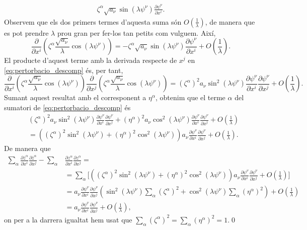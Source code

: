 {\begin{align*}
    \zeta^\alpha\sqrt{a_\nu}\sin(\lambda \psi^\nu)\frac{\partial\psi^\nu}{\partial x^i}.
\end{align*}
Observem que els dos primers termes d'aquesta suma són $O\left(\frac1\lambda\right)$, de manera que es pot prendre $\lambda$ prou gran per fer-los tan petits com vulguem. Així, 
\begin{equation*}
    \frac{\partial}{\partial x^i}\left( \zeta^\alpha\frac{\sqrt{a_\nu}}{\lambda}\cos(\lambda \psi^\nu)\right) = -
    \zeta^\alpha\sqrt{a_\nu}\sin(\lambda \psi^\nu)\frac{\partial\psi^\nu}{\partial x^i} + O\left(\frac1\lambda\right).
\end{equation*}
El producte d'aquest terme amb la derivada respecte de $x^j$ en \ref{eq:pertorbacio_descomp} és, per tant,
\begin{equation*}
    \frac{\partial}{\partial x^i}\left( \zeta^\alpha\frac{\sqrt{a_\nu}}{\lambda}\cos(\lambda \psi^\nu)\right) \frac{\partial}{\partial x^j}\left( \zeta^\alpha\frac{\sqrt{a_\nu}}{\lambda}\cos(\lambda \psi^\nu)\right) = 
    (\zeta^\alpha)^2{a_\nu}\sin^2(\lambda \psi^\nu)\frac{\partial\psi^\nu}{\partial x^i}\frac{\partial\psi^\nu}{\partial x^j} + O\left(\frac1\lambda\right).
\end{equation*}
Sumant aquest resultat amb el corresponent a $\eta^\alpha$, obtenim que el terme $\alpha$ del sumatori de \ref{eq:pertorbacio_descomp} és
\begin{align*}
    &(\zeta^\alpha)^2{a_\nu}\sin^2(\lambda \psi^\nu)\frac{\partial\psi^\nu}{\partial x^i}\frac{\partial\psi^\nu}{\partial x^j} + (\eta^\alpha)^2{a_\nu}\cos^2(\lambda \psi^\nu)\frac{\partial\psi^\nu}{\partial x^i}\frac{\partial\psi^\nu}{\partial x^j} + O\left(\frac1\lambda\right)
    \\&=
    ((\zeta^\alpha)^2\sin^2(\lambda \psi^\nu) + (\eta^\alpha)^2\cos^2(\lambda \psi^\nu)) a_\nu\frac{\partial\psi^\nu}{\partial x^i}\frac{\partial\psi^\nu}{\partial x^j} + O\left(\frac1\lambda\right).
\end{align*}
De manera que 
\begin{align*}
    \sum_\alpha\frac{\partial\overline{z}^\alpha}{\partial x^i}\frac{\partial\overline{z}^\alpha}{\partial x^j}-\sum_\alpha&\frac{\partial z^\alpha}{\partial x^i}\frac{\partial z^\alpha}{\partial x^j}=\\
    &=
    \sum_{\alpha}\Bigg[((\zeta^\alpha)^2\sin^2(\lambda \psi^\nu) + (\eta^\alpha)^2\cos^2(\lambda \psi^\nu)) a_\nu\frac{\partial\psi^\nu}{\partial x^i}\frac{\partial\psi^\nu}{\partial x^j}
    + O\left(\frac1\lambda\right) \Bigg]
    \\
    &=a_\nu\frac{\partial\psi^\nu}{\partial x^i}\frac{\partial\psi^\nu}{\partial x^j}\left( \sin^2(\lambda \psi^\nu)\sum_\alpha(\zeta^\alpha)^2 + \cos^2(\lambda \psi^\nu)\sum_\alpha(\eta^\alpha)^2\right) + O\left(\frac1\lambda\right)
    \\&=
    a_\nu\frac{\partial\psi^\nu}{\partial x^i}\frac{\partial\psi^\nu}{\partial x^j} + O\left(\frac1\lambda\right),
\end{align*}
on per a la darrera igualtat hem usat que $\sum_\alpha(\zeta^\alpha)^2 = \sum_\alpha(\eta^\alpha)^2 = 1$.\qed
}

